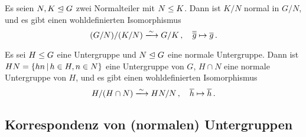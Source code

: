 \begin{corollary}[2.\ Isomorphiesatz]
  Es seien $N, K \mathrel{\trianglelefteq} G$ zwei Normalteiler mit $N \mathrel{\leq} K$.
  Dann ist $K/N$ normal in $G/N$, und es gibt einen wohldefinierten Isomorphismus
  \[
                            (G/N)/(K/N)
    \xlongrightarrow{\sim}  G/K \,,
    \quad                   \class{ \class{g} }
    \mapsto                 \class{g} \,.
  \]
\end{corollary}

\begin{corollary}[3.\ Isomorphiesatz]
  Es sei $H \mathrel{\leq} G$ eine Untergruppe und $N \mathrel{\trianglelefteq} G$ eine normale Untergruppe.
  Dann ist $HN = \{hn \suchthat h \in H, n \in N\}$ eine Untergruppe von $G$, $H \cap N$ eine normale Untergruppe von $H$, und es gibt einen wohldefinierten Isomorphismus
  \[
                            H/(H \cap N)
    \xlongrightarrow{\sim}  HN/N \,,
    \quad                   \class{h}
    \mapsto                 \class{h} \,.
  \]
\end{corollary}



\subsection{Korrespondenz von (normalen) Untergruppen}


